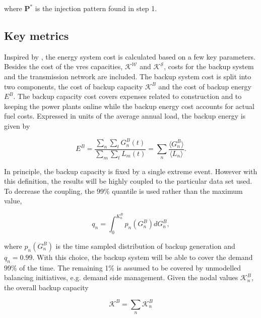 \documentclass[a4paper, 5p, sort&compress]{elsarticle}%
\begin{document}
where $\mathbf{P}^{*}$ is the injection pattern found in step 1.


\subsection{Key metrics}

Inspired by \cite{Sensitivity}, the energy system cost is calculated
based on a few key parameters. Besides the cost of the \gls{vres}
capacities, $\mathcal{K^{W}}$ and $\mathcal{K^S}$, costs for the
backup system and the transmission network are included. The backup
system cost is split into two components, the cost of backup capacity
$\mathcal{K}^{B}$ and the cost of backup energy $E^{B}$. The backup
capacity cost covers expenses related to construction and to keeping
the power plants online while the backup energy cost accounts for
actual fuel costs. Expressed in units of the average annual load, the
backup energy is given by

\begin{equation}
  \label{eq:backup-energy}
  E^{B} =\frac{\sum_{n} \sum_{t} G^{B}_{n}(t)}{\sum_{m} \sum_{t}
    L_{m}(t)} = \sum_{n} \frac{\langle G^{B}_{n} \rangle}{\langle L_{n}
    \rangle} .
\end{equation}

In principle, the backup capacity is fixed by a single extreme
event. However with this definition, the results will be highly
coupled to the particular data set used. To decrease the coupling, the
99\% quantile is used rather than the maximum value,

\begin{equation}
  \label{eq:2}
  q_{n} = \int _{0} ^{K_{n}^{B}} p_{n}(G^{B}_{n})dG^{B}_{n},
\end{equation}

where $p_{n}(G^{B}_{n})$ is the time sampled distribution of backup
generation and $q_{n} = 0.99$. With this choice, the backup system
will be able to cover the demand 99\% of the time. The remaining 1\%
is assumed to be covered by unmodelled balancing initiatives,
e.g. demand side management. Given the nodal values
$\mathcal{K}^{B}_{n}$, the overall backup capacity

\begin{equation}
  \label{eq:4}
  \mathcal{K}^{B} = \sum_{n} \mathcal{K}^{B}_{n}
\end{equation}
\end{document}

